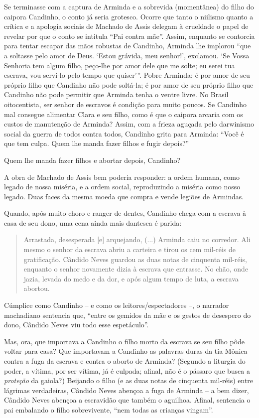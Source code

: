 Se terminasse com a captura de Arminda e a sobrevida (momentânea) do
filho do caipora Candinho, o conto já seria grotesco. Ocorre que tanto o
niilismo quanto a crítica e a apologia sociais de Machado de Assis
delegam à crueldade o papel de revelar por que o conto se intitula ``Pai
contra mãe''. Assim, enquanto se contorcia para tentar escapar das mãos
robustas de Candinho, Arminda lhe implorou ``que a soltasse pelo amor de
Deus. `Estou grávida, meu senhor!', exclamou. `Se Vossa Senhoria tem
algum filho, peço-lhe por amor dele que me solte; eu serei tua escrava,
vou servi-lo pelo tempo que quiser'''. Pobre Arminda: é por amor de seu
próprio filho que Candinho não pode soltá-la; é por amor de seu próprio
filho que Candinho não pode permitir que Arminda tenha o ventre livre.
No Brasil oitocentista, ser senhor de escravos é condição para muito
poucos. Se Candinho mal consegue alimentar Clara e seu filho, como é que
o caipora arcaria com os custos de manutenção de Arminda? Assim, com a
frieza aguçada pelo darwinismo social da guerra de todos contra todos,
Candinho grita para Arminda: ``Você é que tem culpa. Quem lhe manda
fazer filhos e fugir depois?''

Quem lhe manda fazer filhos e abortar depois, Candinho?

A obra de Machado de Assis bem poderia responder: a ordem humana, como
legado de nossa miséria, e a ordem social, reproduzindo a miséria como
nosso legado. Duas faces da mesma moeda que compra e vende legiões de
Armindas.

Quando, após muito choro e ranger de dentes, Candinho chega com a
escrava à casa de seu dono, uma cena ainda mais dantesca é parida:

\begin{quote}
Arrastada, desesperada {[}e{]} arquejando, (...) Arminda caiu no
corredor. Ali mesmo o senhor da escrava abriu a carteira e tirou os cem
mil-réis de gratificação. Cândido Neves guardou as duas notas de
cinquenta mil-réis, enquanto o senhor novamente dizia à escrava que
entrasse. No chão, onde jazia, levada do medo e da dor, e após algum
tempo de luta, a escrava abortou.
\end{quote}

Cúmplice como Candinho -- e como os leitores/espectadores --, o narrador
machadiano sentencia que, ``entre os gemidos da mãe e os gestos de
desespero do dono, Cândido Neves viu todo esse espetáculo''.

Mas, ora, que importava a Candinho o filho morto da escrava se seu filho
pôde voltar para casa? Que importavam a Candinho as palavras duras da
tia Mônica contra a fuga da escrava e contra o aborto de Arminda?
(Segundo a liturgia do poder, a vítima, por ser vítima, já é culpada;
afinal, não é o pássaro que busca a \emph{proteção} da gaiola?) Beijando
o filho (e as duas notas de cinquenta mil-réis) entre lágrimas
verdadeiras, Cândido Neves abençoa a fuga de Arminda -- a bem dizer,
Cândido Neves abençoa a escravidão que também o aguilhoa. Afinal,
sentencia o pai embalando o filho sobrevivente, ``nem todas as crianças
vingam''.

